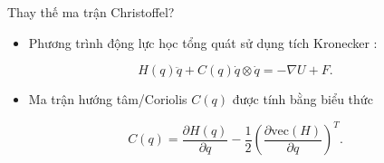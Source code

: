 \begin{frame}{Thay thế ma trận Christoffel?}
    \begin{itemize}
        \item Phương trình động lực học tổng quát sử dụng tích Kronecker \cite{Tuan_Chung_Khoa_Phong_2019}:
    \end{itemize}
    \begin{equation}
        H(q) \ddot{q} + C(q) \dot{q} \otimes \dot{q} = - \nabla U + F.
    \end{equation}
    \begin{itemize}
        \item Ma trận hướng tâm/Coriolis \(C(q)\) được tính bằng biểu thức
    \end{itemize}
    \begin{equation}
        C(q) = \dfrac{\partial H(q)}{\partial q} - \dfrac{1}{2} \left( \dfrac{\partial \text{vec}(H)}{\partial q} \right)^T.
    \end{equation}
\end{frame}